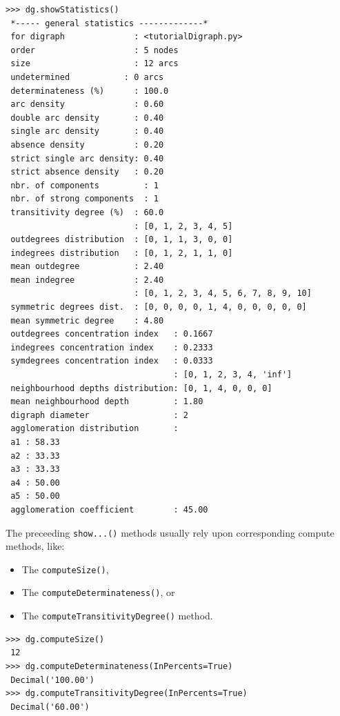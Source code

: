 \begin{lstlisting}[caption={Inspecting a \texttt{Digraph} object},label=list:1.5]
>>> dg.showStatistics()
 *----- general statistics -------------*
 for digraph              : <tutorialDigraph.py>
 order                    : 5 nodes
 size                     : 12 arcs
 undetermined           : 0 arcs
 determinateness (%)      : 100.0
 arc density              : 0.60
 double arc density       : 0.40
 single arc density       : 0.40
 absence density          : 0.20
 strict single arc density: 0.40
 strict absence density   : 0.20
 nbr. of components         : 1
 nbr. of strong components  : 1
 transitivity degree (%)  : 60.0
                          : [0, 1, 2, 3, 4, 5]
 outdegrees distribution  : [0, 1, 1, 3, 0, 0]
 indegrees distribution   : [0, 1, 2, 1, 1, 0]
 mean outdegree           : 2.40
 mean indegree            : 2.40
                          : [0, 1, 2, 3, 4, 5, 6, 7, 8, 9, 10]
 symmetric degrees dist.  : [0, 0, 0, 0, 1, 4, 0, 0, 0, 0, 0]
 mean symmetric degree    : 4.80
 outdegrees concentration index   : 0.1667
 indegrees concentration index    : 0.2333
 symdegrees concentration index   : 0.0333
                                  : [0, 1, 2, 3, 4, 'inf']
 neighbourhood depths distribution: [0, 1, 4, 0, 0, 0]
 mean neighbourhood depth         : 1.80
 digraph diameter                 : 2
 agglomeration distribution       :
 a1 : 58.33
 a2 : 33.33
 a3 : 33.33
 a4 : 50.00
 a5 : 50.00
 agglomeration coefficient        : 45.00
\end{lstlisting}

The preceeding \texttt{show...()} methods usually rely upon corresponding compute methods, like:
\begin{itemize}
\item The \texttt{computeSize()},
\item The \texttt{computeDeterminateness()}, or
\item The \texttt{computeTransitivityDegree()} method.
\end{itemize}
\begin{lstlisting}[caption={Various \texttt{compute...()} methods.}label=list:1.6]
>>> dg.computeSize()
 12
>>> dg.computeDeterminateness(InPercents=True)
 Decimal('100.00')
>>> dg.computeTransitivityDegree(InPercents=True)
 Decimal('60.00')
\end{lstlisting}

